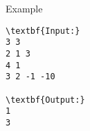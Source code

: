 Example
\begin{verbatim}
\textbf{Input:}
3 3
2 1 3
4 1
3 2 -1 -10

\textbf{Output:}
1
3\end{verbatim}